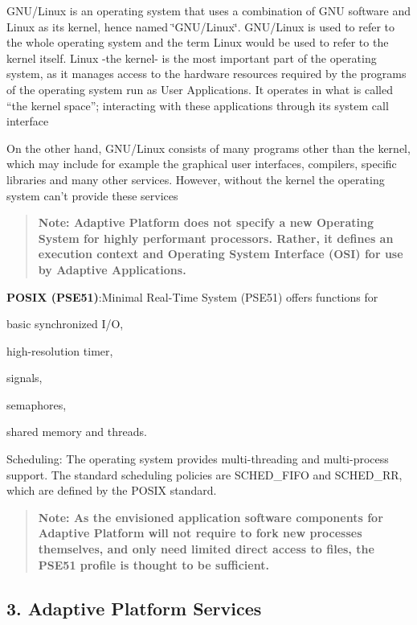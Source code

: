 G\+N\+U/\+Linux is an operating system that uses a combination of G\+NU software and Linux as its kernel, hence named \char`\"{}\+G\+N\+U/\+Linux\char`\"{}. G\+N\+U/\+Linux is used to refer to the whole operating system and the term Linux would be used to refer to the kernel itself. Linux -\/the kernel-\/ is the most important part of the operating system, as it manages access to the hardware resources required by the programs of the operating system run as User Applications. It operates in what is called “the kernel space”; interacting with these applications through its system call interface

On the other hand, G\+N\+U/\+Linux consists of many programs other than the kernel, which may include for example the graphical user interfaces, compilers, specific libraries and many other services. However, without the kernel the operating system can’t provide these services  \begin{quote}
{\bfseries Note\+: Adaptive Platform does not specify a new Operating System for highly performant processors. Rather, it defines an execution context and Operating System Interface (O\+SI) for use by Adaptive Applications.} \end{quote}


{\bfseries P\+O\+S\+IX (P\+S\+E51)}\+:Minimal Real-\/\+Time System (P\+S\+E51) offers functions for
\begin{DoxyEnumerate}
\item basic synchronized I/O,
\item high-\/resolution timer,
\item signals,
\item semaphores,
\item shared memory and threads.
\end{DoxyEnumerate}

 Scheduling\+: The operating system provides multi-\/threading and multi-\/process support. The standard scheduling policies are S\+C\+H\+E\+D\+\_\+\+F\+I\+FO and S\+C\+H\+E\+D\+\_\+\+RR, which are defined by the P\+O\+S\+IX standard.

\begin{quote}
{\bfseries Note\+: As the envisioned application software components for Adaptive Platform will not require to fork new processes themselves, and only need limited direct access to files, the P\+S\+E51 profile is thought to be sufficient.} \end{quote}


\subsection*{3. Adaptive Platform Services}


